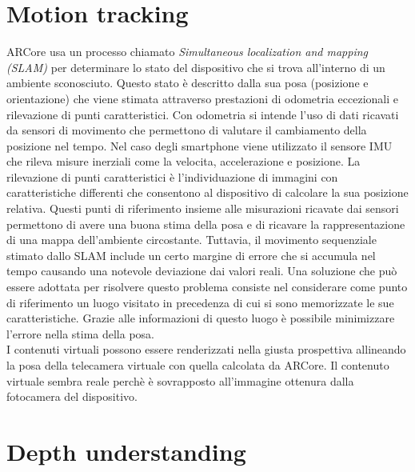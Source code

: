 \documentclass[crop=false, class=book]{standalone}
\begin{document}
	\chapter{Motion tracking}
	
		ARCore usa un processo chiamato \emph{Simultaneous localization and mapping (SLAM)} per determinare lo stato del
		dispositivo che si trova all'interno di un ambiente sconosciuto. Questo stato è descritto dalla sua posa (posizione 
		e orientazione) che viene stimata attraverso prestazioni di odometria eccezionali e rilevazione di punti 						caratteristici. Con odometria si intende l'uso di dati ricavati da sensori di movimento che permettono di valutare il 			cambiamento della posizione nel tempo. Nel caso degli smartphone viene utilizzato il sensore IMU che 							rileva misure inerziali come la velocita, accelerazione e posizione. La rilevazione di punti caratteristici è 					l'individuazione di immagini con caratteristiche differenti che consentono al dispositivo di calcolare la sua posizione 		relativa. Questi punti di riferimento insieme alle misurazioni ricavate dai sensori permettono di avere una 					buona stima della posa e di ricavare la rappresentazione di una mappa dell'ambiente circostante. Tuttavia, 						il movimento sequenziale stimato dallo SLAM include un certo margine di errore che si accumula nel tempo causando 				una notevole deviazione dai valori reali. Una soluzione che può essere adottata per risolvere questo 							problema consiste nel considerare come punto di riferimento un luogo visitato in precedenza di cui si sono 						memorizzate le sue caratteristiche. Grazie alle informazioni di questo luogo è possibile minimizzare l'errore nella 			stima della posa.\\
		I contenuti virtuali possono essere renderizzati nella giusta prospettiva allineando la posa della telecamera virtuale 			con quella calcolata da ARCore. Il contenuto virtuale sembra reale perchè è sovrapposto all'immagine ottenura dalla 			fotocamera del dispositivo.
		
	\chapter{Depth understanding}
	
\end{document}
